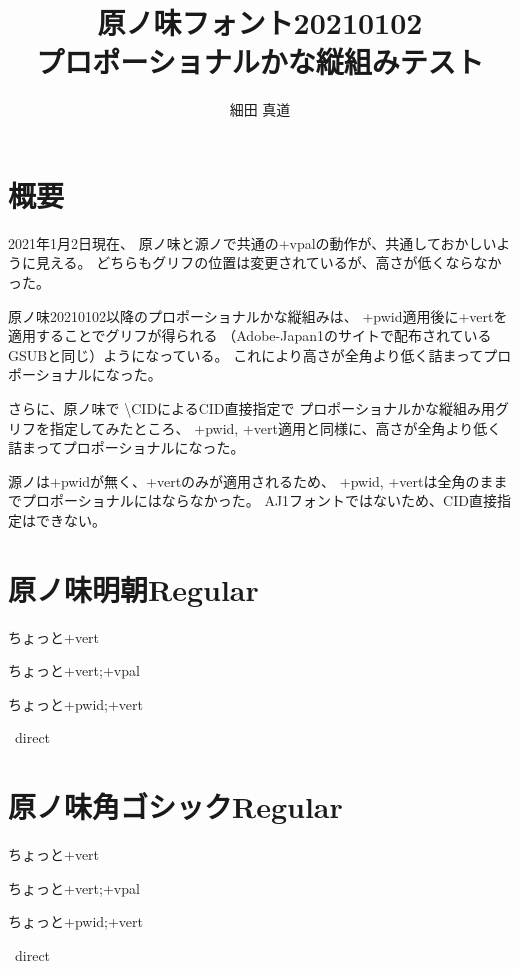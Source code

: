 \documentclass[tate,paper={297mm,210mm}]{jlreq}
\title{原ノ味フォント20210102 \\ プロポーショナルかな縦組みテスト}
\author{細田 真道}
\begin{document}
\maketitle

\section*{概要}

2021年1月2日現在、
原ノ味と源ノで共通の+vpalの動作が、共通しておかしいように見える。
どちらもグリフの位置は変更されているが、高さが低くならなかった。

原ノ味20210102以降のプロポーショナルかな縦組みは、
+pwid適用後に+vertを適用することでグリフが得られる
（Adobe-Japan1のサイトで配布されているGSUBと同じ）ようになっている。
これにより高さが全角より低く詰まってプロポーショナルになった。

さらに、原ノ味で \textbackslash CIDによるCID直接指定で
プロポーショナルかな縦組み用グリフを指定してみたところ、
+pwid, +vert適用と同様に、高さが全角より低く詰まってプロポーショナルになった。

源ノは+pwidが無く、+vertのみが適用されるため、
+pwid, +vertは全角のままでプロポーショナルにはならなかった。
AJ1フォントではないため、CID直接指定はできない。

\clearpage

\section*{原ノ味明朝Regular}

\hmrnone\hbox{\tate\vrule ちょっと\vrule +vert}

\hmrvpal\hbox{\tate\vrule ちょっと\vrule +vert;+vpal}

\hmrpwidvert\hbox{\tate\vrule ちょっと\vrule +pwid;+vert}

\hmrnone\hbox{\tate\vrule%
  \vrule direct}

\section*{原ノ味角ゴシックRegular}

\hgrnone\hbox{\tate\vrule ちょっと\vrule +vert}

\hgrvpal\hbox{\tate\vrule ちょっと\vrule +vert;+vpal}

\hgrpwidvert\hbox{\tate\vrule ちょっと\vrule +pwid;+vert}

\hgrnone\hbox{\tate\vrule%
  \vrule direct}
\end{document}
